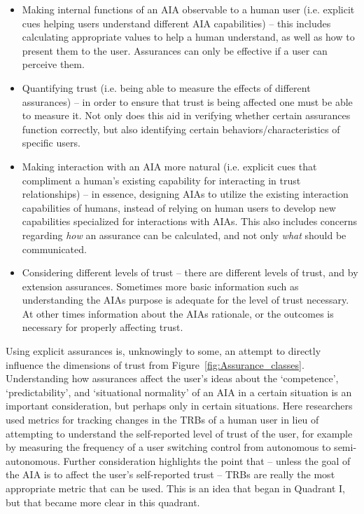 \begin{itemize}
    \item Making internal functions of an AIA observable to a human user (i.e. explicit cues helping users understand different AIA capabilities) -- this includes calculating appropriate values to help a human understand, as well as how to present them to the user. Assurances can only be effective if a user can perceive them.
    \item Quantifying trust (i.e. being able to measure the effects of different assurances) -- in order to ensure that trust is being affected one must be able to measure it. Not only does this aid in verifying whether certain assurances function correctly, but also identifying certain behaviors/characteristics of specific users.
    \item Making interaction with an AIA more natural (i.e. explicit cues that compliment a human's existing capability for interacting in trust relationships) -- in essence, designing AIAs to utilize the existing interaction capabilities of humans, instead of relying on human users to develop new capabilities specialized for interactions with AIAs. This also includes concerns regarding \emph{how} an assurance can be calculated, and not only \emph{what} should be communicated.
    \item Considering different levels of trust -- there are different levels of trust, and by extension assurances. Sometimes more basic information such as understanding the AIAs purpose is adequate for the level of trust necessary. At other times information about the AIAs rationale, or the outcomes is necessary for properly affecting trust.
\end{itemize}

Using explicit assurances is, unknowingly to some, an attempt to directly influence the dimensions of trust from Figure~\ref{fig:Assurance_classes}. Understanding how assurances affect the user's ideas about the `competence', `predictability', and `situational normality' of an AIA in a certain situation is an important consideration, but perhaps only in certain situations. Here researchers used metrics for tracking changes in the TRBs of a human user in lieu of attempting to understand the self-reported level of trust of the user, for example by measuring the frequency of a user switching control from autonomous to semi-autonomous. Further consideration highlights the point that -- unless the goal of the AIA is to affect the user's self-reported trust -- TRBs are really the most appropriate metric that can be used. This is an idea that began in Quadrant I, but that became more clear in this quadrant.
